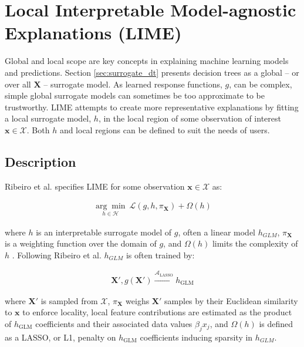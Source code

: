 \documentclass[sigconf]{acmart}
\begin{document}
\section{Local Interpretable Model-agnostic Explanations (LIME)}
\label{sec:lime}

Global and local scope are key concepts in explaining machine learning models and predictions. Section \ref{sec:surrogate_dt} presents decision trees as a global -- or over all $\mathbf{X}$ -- surrogate model. As learned response functions, $g$, can be complex, simple global surrogate models can sometimes be too approximate to be trustworthy. LIME attempts to create more representative explanations by fitting a local surrogate model, $h$, in the local region of some observation of interest $\mathbf{x} \in \mathcal{X}$. Both $h$ and local regions can be defined to suit the needs of users.

\subsection{Description}

Ribeiro et al. specifies LIME for some observation $\mathbf{x} \in \mathcal{X}$ as:

\begin{equation}
\begin{aligned}
\underset{h \in \mathcal{H}}{\arg\min}\:\mathcal{L}(g, h, \pi_{\mathbf{X}}) + \Omega(h)
\end{aligned}
\end{equation}

\noindent where $h$ is an interpretable surrogate model of $g$, often a linear model $h_{GLM}$, $\pi_{\mathbf{X}}$ is a weighting function over the domain of $g$, and $\Omega(h)$ limits the complexity of $h$ \cite{lime}. Following Ribeiro et al. $h_{GLM}$ is often trained by:

\begin{equation}
\begin{aligned}
\mathbf{X}', g(\mathbf{X}') \xrightarrow{\mathcal{A}_{\text{LASSO}}} h_{\text{GLM}}
\end{aligned}
\end{equation}

\noindent where $\mathbf{X}'$ is sampled from $\mathcal{X}$, $\pi_{\mathbf{X}}$ weighs $\mathbf{X}'$ samples by their Euclidean similarity to $\mathbf{x}$ to enforce locality, local feature contributions are estimated as the product of $h_{\text{GLM}}$ coefficients and their associated data values $\beta_j x_j$, and $\Omega(h)$ is defined as a LASSO, or L1, penalty on $h_{\text{GLM}}$ coefficients inducing sparsity in $h_{GLM}$. 		
\end{document}
